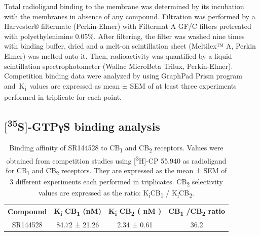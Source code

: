 \documentclass[empirical, authordate, issue]{jote-new-article}
\begin{document}
Total radioligand binding to the membrane was determined by its incubation with the membranes in absence of any compound. Filtration was performed by a Harvester® filtermate (Perkin-Elmer) with Filtermat A GF/C filters pretreated with polyethylenimine 0.05\%. After filtering, the filter was washed nine times with binding buffer, dried and a melt-on scintillation sheet (Meltilex™ A, Perkin Elmer) was melted onto it. Then, radioactivity was quantified by a liquid scintillation spectrophotometer (Wallac MicroBeta Trilux, Perkin-Elmer). Competition binding data were analyzed by using GraphPad Prism program and K\textsubscript{i} values are expressed as mean ± SEM of at least three experiments performed in triplicate for each point.

\subsection{[\textsuperscript{35}S]-GTPγS binding analysis}


\begin{table}[t]

  \begin{fullwidth}
    \caption{Binding affinity of SR144528 to CB\textsubscript{1} and CB\textsubscript{2} receptors. Values were obtained from competition studies using [\textsuperscript{3}H]-CP 55,940 as radioligand for CB\textsubscript{1} and CB\textsubscript{2} receptors. They are expressed as the mean ± SEM of 3 different experiments each performed in triplicates. CB\textsubscript{2 }selectivity values are expressed as the ratio: K\textsubscript{i}CB\textsubscript{1 }/ K\textsubscript{i}CB\textsubscript{2}.
    }
    \label{tab:1}
    \begin{tabular}{c  c  c  c}

      \textbf{Compound} & \textbf{ K\textsubscript{i} CB\textsubscript{1}  (\textbf{nM})} & \textbf{K\textsubscript{i}  CB\textsubscript{2}  ( \textbf{nM}  )} & \textbf{CB\textsubscript{1} /CB\textsubscript{2}  ratio} \\
      SR144528          & 84.72 ± 21.26                                                   & 2.34 ± 0.61                                                        & 36.2                                                     \\
    \end{tabular}
  \end{fullwidth}
\end{table}
\end{document}

